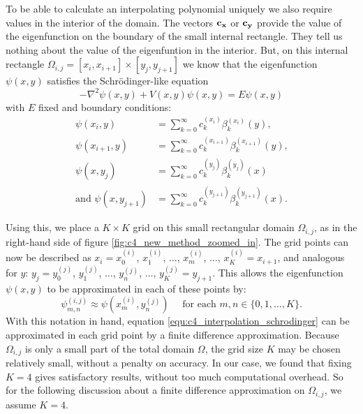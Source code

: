 To be able to calculate an interpolating polynomial uniquely we also require values in the interior of the domain. The vectors $\vb{c_x}$ or $\vb{c_y}$ provide the value of the eigenfunction on the boundary of the small internal rectangle. They tell us nothing about the value of the eigenfuntion in the interior. But, on this internal rectangle $\Omega_{i, j} = [x_i, x_{i+1}] \times [y_j, y_{j+1}]$ we know that the eigenfunction $\psi(x, y)$ satisfies the Schrödinger-like equation
\begin{equation}\label{equ:c4_interpolation_schrodinger}
    -\nabla^2 \psi(x, y) + V(x, y) \psi(x, y) = E \psi(x, y)
\end{equation}
with $E$ fixed and boundary conditions:
\begin{align*}
    \psi(x_i, y)                 & = \sum_{k=0}^\infty c_k^{(x_i)} \beta_k^{(x_i)}(y)\text{,}          \\
    \psi(x_{i+1}, y)             & = \sum_{k=0}^\infty c_k^{(x_{i+1})} \beta_k^{(x_{i+1})}(y)\text{,}  \\
    \psi(x, y_j)                 & = \sum_{k=0}^\infty c_k^{(y_j)} \beta_k^{(y_j)}(x)                  \\
    \text{and } \psi(x, y_{j+1}) & = \sum_{k=0}^\infty c_k^{(y_{j+1})} \beta_k^{(y_{j+1})}(x) \text{.}
\end{align*}

Using this, we place a $K \times K$ grid on this small rectangular domain $\Omega_{i, j}$, as in the right-hand side of figure \ref{fig:c4_new_method_zoomed_in}. The grid points can now be described as $x_i = x^{(i)}_0$, $x^{(i)}_1$, $\dots$, $x^{(i)}_m$, $\dots$, $x^{(i)}_K = x_{i+1}$, and analogous for $y$: $y_j = y^{(j)}_0$, $y^{(j)}_1$, $\dots$, $y^{(j)}_n$, $\dots$, $y^{(j)}_K = y_{j+1}$. This allows the eigenfunction $\psi(x, y)$ to be approximated in each of these points by:
$$
    \psi^{(i,j)}_{m,n} \approx \psi(x^{(i)}_m, y^{(j)}_n) \quad \text{ for each $m, n \in \{0, 1, \dots, K\}$.}
$$
With this notation in hand, equation \ref{equ:c4_interpolation_schrodinger} can be approximated in each grid point by a finite difference approximation. Because $\Omega_{i,j}$ is only a small part of the total domain $\Omega$, the grid size $K$ may be chosen relatively small, without a penalty on accuracy. In our case, we found that fixing $K = 4$ gives satisfactory results, without too much computational overhead. So for the following discussion about a finite difference approximation on $\Omega_{i,j}$, we assume $K = 4$.

